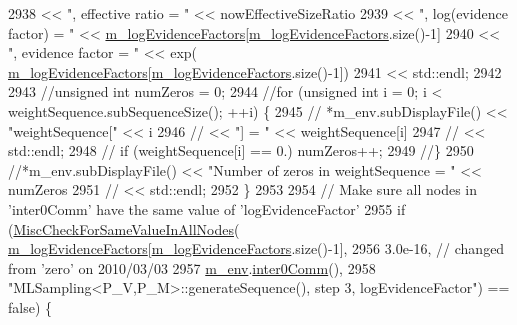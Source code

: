 \begin{DoxyCode}
2938                                 << \textcolor{stringliteral}{", effective ratio = "}                      << nowEffectiveSizeRatio
2939                                 << \textcolor{stringliteral}{", log(evidence factor) = "}                 << 
      \hyperlink{class_q_u_e_s_o_1_1_m_l_sampling_a75f2ceab4a2c6774b3fa07d74221dbf3}{m\_logEvidenceFactors}[\hyperlink{class_q_u_e_s_o_1_1_m_l_sampling_a75f2ceab4a2c6774b3fa07d74221dbf3}{m\_logEvidenceFactors}.size()-1]
2940                                 << \textcolor{stringliteral}{", evidence factor = "}                      << exp(
      \hyperlink{class_q_u_e_s_o_1_1_m_l_sampling_a75f2ceab4a2c6774b3fa07d74221dbf3}{m\_logEvidenceFactors}[\hyperlink{class_q_u_e_s_o_1_1_m_l_sampling_a75f2ceab4a2c6774b3fa07d74221dbf3}{m\_logEvidenceFactors}.size()-1])
2941                                 << std::endl;
2942 
2943         \textcolor{comment}{//unsigned int numZeros = 0;}
2944         \textcolor{comment}{//for (unsigned int i = 0; i < weightSequence.subSequenceSize(); ++i) \{}
2945         \textcolor{comment}{//  *m\_env.subDisplayFile() << "weightSequence[" << i}
2946         \textcolor{comment}{//                          << "] = " << weightSequence[i]}
2947         \textcolor{comment}{//                         << std::endl;}
2948         \textcolor{comment}{//  if (weightSequence[i] == 0.) numZeros++;}
2949         \textcolor{comment}{//\}}
2950         \textcolor{comment}{//*m\_env.subDisplayFile() << "Number of zeros in weightSequence = " << numZeros}
2951         \textcolor{comment}{//                        << std::endl;}
2952       \}
2953 
2954       \textcolor{comment}{// Make sure all nodes in 'inter0Comm' have the same value of 'logEvidenceFactor'}
2955       \textcolor{keywordflow}{if} (\hyperlink{namespace_q_u_e_s_o_a4166a375c5adbea35afaaf20775bc519}{MiscCheckForSameValueInAllNodes}(
      \hyperlink{class_q_u_e_s_o_1_1_m_l_sampling_a75f2ceab4a2c6774b3fa07d74221dbf3}{m\_logEvidenceFactors}[\hyperlink{class_q_u_e_s_o_1_1_m_l_sampling_a75f2ceab4a2c6774b3fa07d74221dbf3}{m\_logEvidenceFactors}.size()-1],
2956                                             3.0e-16, \textcolor{comment}{// changed from 'zero' on 2010/03/03}
2957                                             \hyperlink{class_q_u_e_s_o_1_1_m_l_sampling_a13f1ca4fe9f94822fe572a743eaced1d}{m\_env}.\hyperlink{class_q_u_e_s_o_1_1_base_environment_a689e4d140c74d495d97eb498714a4b82}{inter0Comm}(),
2958                                             \textcolor{stringliteral}{"MLSampling<P\_V,P\_M>::generateSequence(), step 3,
       logEvidenceFactor"}) == \textcolor{keyword}{false}) \{

\end{DoxyCode}
